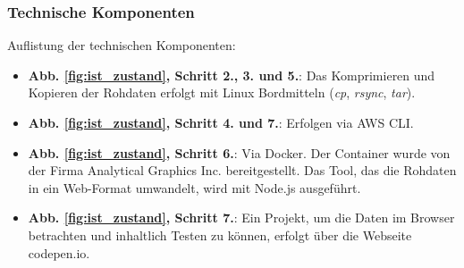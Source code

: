 \subsubsection{Technische Komponenten}
Auflistung der technischen Komponenten:
\begin{itemize}
\item \textbf{Abb. \ref{fig:ist_zustand}, Schritt 2., 3. und 5.}: Das Komprimieren und Kopieren der Rohdaten erfolgt mit Linux Bordmitteln (\emph{cp}, \emph{rsync}, \emph{tar}).
\item \textbf{Abb. \ref{fig:ist_zustand}, Schritt 4. und 7.}: Erfolgen via AWS CLI.
\item \textbf{Abb. \ref{fig:ist_zustand}, Schritt 6.}: Via Docker. Der Container wurde von der Firma Analytical Graphics Inc. \cite{AGI2010} bereitgestellt. Das Tool, das die Rohdaten in ein Web-Format umwandelt, wird mit Node.js ausgeführt.
\item \textbf{Abb. \ref{fig:ist_zustand}, Schritt 7.}: Ein Projekt, um die Daten im Browser betrachten und inhaltlich Testen zu können, erfolgt über die Webseite codepen.io.
\end{itemize}


